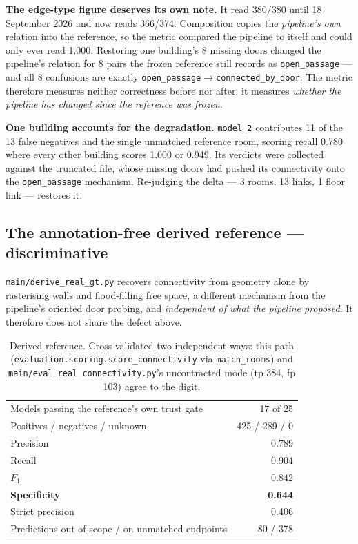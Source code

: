 \documentclass[11pt,a4paper]{article}
\newcommand{\code}[1]{\texttt{\small #1}}
\begin{document}
\noindent
\textbf{The edge-type figure deserves its own note.} It read 380/380 until
18 September 2026 and now reads 366/374. Composition copies the
\emph{pipeline's own} relation into the reference, so the metric compared the
pipeline to itself and could only ever read 1.000. Restoring one building's 8
missing doors changed the pipeline's relation for 8 pairs the frozen reference
still records as \code{open\_passage} --- and all 8 confusions are exactly
\code{open\_passage}$\to$\code{connected\_by\_door}. The metric therefore
measures neither correctness before nor after: it measures \emph{whether the
pipeline has changed since the reference was frozen}.

\noindent
\textbf{One building accounts for the degradation.} \code{model\_2} contributes
11 of the 13 false negatives and the single unmatched reference room, scoring
recall 0.780 where every other building scores 1.000 or 0.949. Its verdicts were
collected against the truncated file, whose missing doors had pushed its
connectivity onto the \code{open\_passage} mechanism. Re-judging the delta ---
3 rooms, 13 links, 1 floor link --- restores it.

\subsection{The annotation-free derived reference --- discriminative}

\code{main/derive\_real\_gt.py} recovers connectivity from geometry alone by
rasterising walls and flood-filling free space, a different mechanism from the
pipeline's oriented door probing, and \emph{independent of what the pipeline
proposed}. It therefore does not share the defect above.

\begin{table}[ht]
\centering
\small
\begin{tabular}{lr}
\toprule
Models passing the reference's own trust gate & 17 of 25 \\
Positives / negatives / unknown & 425 / 289 / 0 \\
Precision & 0.789 \\
Recall & 0.904 \\
$F_1$ & 0.842 \\
\textbf{Specificity} & \textbf{0.644} \\
Strict precision & 0.406 \\
Predictions out of scope / on unmatched endpoints & 80 / 378 \\
\bottomrule
\end{tabular}
\caption{Derived reference. Cross-validated two independent ways: this path
(\code{evaluation.scoring.score\_connectivity} via \code{match\_rooms}) and
\code{main/eval\_real\_connectivity.py}'s uncontracted mode (tp 384, fp 103)
agree to the digit.}
\end{table}
\end{document}

